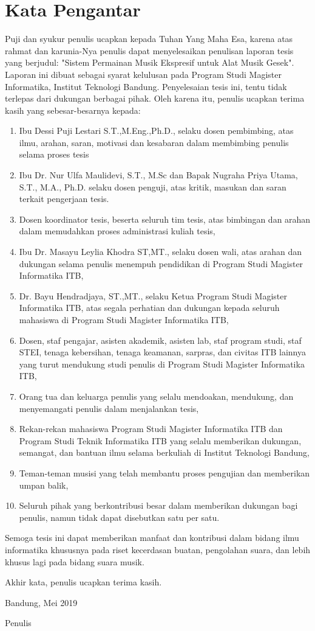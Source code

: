 \chapter*{Kata Pengantar}

Puji dan syukur penulis ucapkan kepada Tuhan Yang Maha Esa, karena atas rahmat dan karunia-Nya penulis dapat menyelesaikan penulisan laporan tesis yang berjudul: "Sistem Permainan Musik Ekspresif untuk Alat Musik Gesek". Laporan ini dibuat sebagai syarat kelulusan pada Program Studi Magister Informatika, Institut Teknologi Bandung. Penyelesaian tesis ini, tentu tidak terlepas dari dukungan berbagai pihak. Oleh karena itu, penulis ucapkan terima kasih yang sebesar-besarnya kepada:

\begin{enumerate}
\item Ibu Dessi Puji Lestari S.T.,M.Eng.,Ph.D., selaku dosen pembimbing, atas ilmu, arahan, saran, motivasi dan kesabaran dalam membimbing penulis selama proses tesis
\item Ibu Dr. Nur Ulfa Maulidevi, S.T., M.Sc dan Bapak Nugraha Priya Utama, S.T., M.A., Ph.D. selaku dosen penguji, atas kritik, masukan dan saran terkait pengerjaan tesis. %
% 
\item %
Dosen koordinator tesis, beserta seluruh tim tesis, atas bimbingan dan arahan dalam memudahkan proses administrasi kuliah tesis,
\item Ibu Dr. Masayu Leylia Khodra ST,MT., selaku dosen wali, atas arahan dan dukungan selama penulis menempuh pendidikan di Program Studi Magister Informatika ITB,
\item Dr. Bayu Hendradjaya, ST.,MT., selaku Ketua Program Studi Magister Informatika ITB, atas segala perhatian dan dukungan kepada seluruh mahasiswa di Program Studi Magister Informatika ITB,
\item Dosen, staf pengajar, asisten akademik, asisten lab, staf program studi, staf STEI, tenaga kebersihan, tenaga keamanan, sarpras, dan civitas ITB lainnya yang turut mendukung studi penulis di Program Studi Magister Informatika ITB,
\item Orang tua dan keluarga penulis yang selalu mendoakan, mendukung, dan menyemangati penulis dalam menjalankan tesis,
\item Rekan-rekan mahasiswa Program Studi Magister Informatika ITB dan Program Studi Teknik Informatika ITB yang selalu memberikan dukungan, semangat, dan bantuan ilmu selama berkuliah di Institut Teknologi Bandung,
\item Teman-teman musisi yang telah membantu proses pengujian dan memberikan umpan balik,
\item Seluruh pihak yang berkontribusi besar dalam memberikan dukungan bagi penulis, namun tidak dapat disebutkan satu per satu.
\end{enumerate}

Semoga tesis ini dapat memberikan manfaat dan kontribusi dalam bidang ilmu informatika khususnya pada riset kecerdasan buatan, pengolahan suara, dan lebih khusus lagi pada bidang suara musik.

Akhir kata, penulis ucapkan terima kasih.

\vspace{15mm}

Bandung, Mei 2019

Penulis
